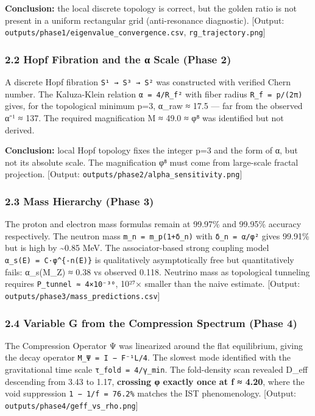 \documentclass[
]{article}
\begin{document}
\textbf{Conclusion:} the local discrete topology is correct, but the
golden ratio is not present in a uniform rectangular grid
(anti-resonance diagnostic). {[}Output:
\texttt{outputs/phase1/eigenvalue\_convergence.csv},
\texttt{rg\_trajectory.png}{]}

\subsubsection{2.2 Hopf Fibration and the α Scale (Phase
2)}\label{hopf-fibration-and-the-ux3b1-scale-phase-2}

A discrete Hopf fibration \texttt{S¹\ →\ S³\ →\ S²} was constructed with
verified Chern number. The Kaluza-Klein relation \texttt{α\ =\ 4/R\_f²}
with fiber radius \texttt{R\_f\ =\ p/(2π)} gives, for the topological
minimum p=3, α\_raw ≈ 17.5 --- far from the observed α⁻¹ ≈ 137. The
required magnification M ≈ 49.0 ≈ φ⁸ was identified but not derived.

\textbf{Conclusion:} local Hopf topology fixes the integer p=3 and the
form of α, but not its absolute scale. The magnification φ⁸ must come
from large-scale fractal projection. {[}Output:
\texttt{outputs/phase2/alpha\_sensitivity.png}{]}

\subsubsection{2.3 Mass Hierarchy (Phase
3)}\label{mass-hierarchy-phase-3}

The proton and electron mass formulas remain at 99.97\% and 99.95\%
accuracy respectively. The neutron mass \texttt{m\_n\ =\ m\_p(1+δ\_n)}
with \texttt{δ\_n\ =\ α/φ²} gives 99.91\% but is high by
\textasciitilde0.85 MeV. The associator-based strong coupling model
\texttt{α\_s(E)\ =\ C·φ\^{}\{-n(E)\}} is qualitatively asymptotically
free but quantitatively fails: α\_s(M\_Z) ≈ 0.38 vs observed 0.118.
Neutrino mass as topological tunneling requires
\texttt{P\_tunnel\ ≈\ 4×10⁻³⁰}, 10²⁷× smaller than the naive estimate.
{[}Output: \texttt{outputs/phase3/mass\_predictions.csv}{]}

\subsubsection{2.4 Variable G from the Compression Spectrum (Phase
4)}\label{variable-g-from-the-compression-spectrum-phase-4}

The Compression Operator Ψ was linearized around the flat equilibrium,
giving the decay operator \texttt{M\_Ψ\ =\ I\ −\ F⁻¹L/4}. The slowest
mode identified with the gravitational time scale
\texttt{τ\_fold\ =\ 4/γ\_min}. The fold-density scan revealed D\_eff
descending from 3.43 to 1.17, \textbf{crossing φ exactly once at f ≈
4.20}, where the void suppression \texttt{1\ −\ 1/f\ =\ 76.2\%} matches
the IST phenomenology. {[}Output:
\texttt{outputs/phase4/geff\_vs\_rho.png}{]}
\end{document}
